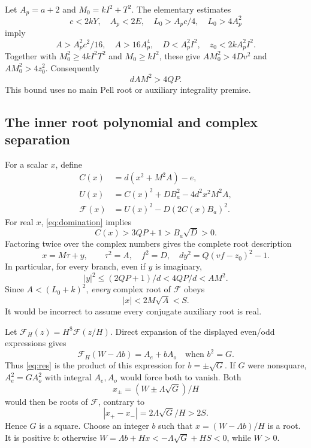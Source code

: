\documentclass[11 pt]{article}
\begin{document}
Let $ A_p=a+2 $ and $ M_0=kI^2+T^2 $. The elementary estimates
\[
c<2 kY,\quad A_p<2 E,\quad L_0>A_pc/4,\quad L_0>4 A_p^2
\]
imply
\[
A>A_p^2 c^2/16,\quad A>16 A_p^4,\quad D<A_p^2 I^2,
\quad z_0<2 kA_p^2 I^2.
\]
Together with $ M_0^2\ge 4 kI^2 T^2 $ and $ M_0\ge kI^2 $, these give
$ AM_0^2>4 Dv^2 $ and $ AM_0^2>4 z_0^2 $. Consequently
\begin{equation}\label{eq:domination}
dAM^2>4 QP.
\end{equation}
This bound uses no main Pell root or auxiliary integrality premise.

\subsection{The inner root polynomial and complex separation}
For a scalar $ x $, define
\begin{align*}
C(x)&=d(x^2+M^2 A)-e,\\
U(x)&=C(x)^2+DB_a^2-4 d^2 x^2 M^2 A,\\
\mathcal F(x)&=U(x)^2-D(2 C(x)B_a)^2.
\end{align*}
For real $ x $, \eqref{eq:domination} implies
\begin{equation}\label{eq:cpositive}
C(x)>3 QP+1>B_a\sqrt D>0.
\end{equation}
Factoring twice over the complex numbers gives the complete root description
\[
x=M\tau+y,\qquad \tau^2=A,\quad f^2=D,\quad
 d y^2=Q(vf-z_0)^2-1.
\]
In particular, for every branch, even if $ y $ is imaginary,
\[
|y|^2\le(2 QP+1)/d<4 QP/d<AM^2.
\]
Since $ A<(L_0+k)^2 $, \emph{every} complex root of $\mathcal F $ obeys
\begin{equation}\label{eq:rootbound}
|x|<2 M\sqrt A<S.
\end{equation}
It would be incorrect to assume every conjugate auxiliary root is real.

Let $\mathcal F_H(z)=H^8\mathcal F(z/H)$. Direct expansion of the displayed even/odd expressions gives
\[
\mathcal F_H(W-\Lambda b)=A_e+bA_o\quad\text{when }b^2=G.
\]
Thus \eqref{eq:res} is the product of this expression for $ b=\pm\sqrt G $. If $ G $ were nonsquare, $ A_e^2=GA_o^2 $ with integral $ A_e,A_o $ would force both to vanish. Both
\[
x_\pm=(W\pm\Lambda\sqrt G)/H
\]
would then be roots of $\mathcal F $, contrary to
\[
|x_+-x_-|=2\Lambda\sqrt G/H>2 S.
\]
Hence $ G $ is a square. Choose an integer $ b $ such that
$ x=(W-\Lambda b)/H $ is a root. It is positive $ b $: otherwise
$ W=\Lambda b+Hx<-\Lambda\sqrt G+HS<0 $, while $ W>0 $.
\end{document}
